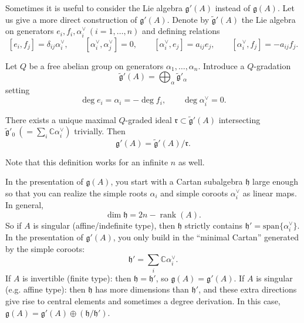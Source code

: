 \documentclass[12pt]{article}
\begin{document}
\begin{remark}
    Sometimes it is useful to consider the Lie algebra $\mathfrak{g}'(A)$ instead
    of $\mathfrak{g}(A)$. Let us give a more direct construction of
    $\mathfrak{g}'(A)$. Denote by $\tilde{\mathfrak{g}}'(A)$ the Lie algebra on
    generators $e_i,f_i,\alpha_i^\vee \ (i=1,\dots,n)$ and defining relations
    \[
        [e_i,f_j] = \delta_{ij}\alpha_i^\vee, \qquad
        [\alpha_i^\vee,\alpha_j^\vee]=0, \qquad
        [\alpha_i^\vee,e_j] = a_{ij}e_j, \qquad
        [\alpha_i^\vee,f_j] = -a_{ij}f_j.
    \]

    Let $Q$ be a free abelian group on generators $\alpha_1,\dots,\alpha_n$.
    Introduce a $Q$-gradation
    \[
        \tilde{\mathfrak{g}}'(A) = \bigoplus_{\alpha} \tilde{\mathfrak{g}}'_\alpha
    \]
    setting
    \[
        \deg e_i = \alpha_i = -\deg f_i, \qquad
        \deg \alpha_i^\vee = 0.
    \]

    There exists a unique maximal $Q$-graded ideal
    $\mathfrak{r} \subset \tilde{\mathfrak{g}}'(A)$ intersecting
    $\tilde{\mathfrak{g}}'_0 \ (= \sum_i \mathbb{C}\alpha_i^\vee)$ trivially.
    Then
    \[
        \mathfrak{g}'(A) = \tilde{\mathfrak{g}}'(A)/\mathfrak{r}.
    \]

    Note that this definition works for an infinite $n$ as well.
\end{remark}

\begin{remark}
    In the presentation of $\mathfrak{g}(A)$, you start with a Cartan subalgebra $\mathfrak{h}$ large enough so that you can realize the simple roots $\alpha_i$ and simple coroots $\alpha_i^\vee$ as linear maps. In general,
    \[
        \dim \mathfrak{h} = 2n - \operatorname{rank}(A).
    \]
    So if $A$ is singular (affine/indefinite type), then $\mathfrak{h}$ strictly contains $\mathfrak{h}' = \mathrm{span}\{\alpha_i^\vee\}$.
    In the presentation of $\mathfrak{g}'(A)$, you only build in the “minimal Cartan” generated by the simple coroots:
    \[
        \mathfrak{h}' = \sum_i \mathbb{C} \alpha_i^\vee.
    \]
    If $A$ is invertible (finite type): then $\mathfrak{h} = \mathfrak{h}'$, so $\mathfrak{g}(A) = \mathfrak{g}'(A)$. If $A$ is singular (e.g. affine type): then $\mathfrak{h}$ has more dimensions than $\mathfrak{h}'$, and these extra directions give rise to central elements and sometimes a degree derivation. In this case, $\mathfrak{g}(A) = \mathfrak{g}'(A) \oplus (\mathfrak{h}/\mathfrak{h}')$.
\end{remark}
\end{document}
